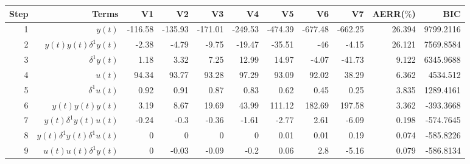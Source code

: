 \begin{tabular}{rrrrrrrrrrr}
Step & Terms & V1 & V2 & V3 & V4 & V5 & V6 & V7 & AERR($\%$) & BIC \\ 
\hline 
1 & $y(t)$ & -116.58 & -135.93 & -171.01 & -249.53 & -474.39 & -677.48 & -662.25 & 26.394 & 9799.2116 \\ 
2 & $y(t)y(t)\delta^1 y(t)$ & -2.38 & -4.79 & -9.75 & -19.47 & -35.51 & -46 & -4.15 & 26.121 & 7569.8584 \\ 
3 & $\delta^1 y(t)$ & 1.18 & 3.32 & 7.25 & 12.99 & 14.97 & -4.07 & -41.73 & 9.122 & 6345.9688 \\ 
4 & $u(t)$ & 94.34 & 93.77 & 93.28 & 97.29 & 93.09 & 92.02 & 38.29 & 6.362 & 4534.512 \\ 
5 & $\delta^1 u(t)$ & 0.92 & 0.91 & 0.87 & 0.83 & 0.62 & 0.45 & 0.25 & 3.835 & 1289.4161 \\ 
6 & $y(t)y(t)y(t)$ & 3.19 & 8.67 & 19.69 & 43.99 & 111.12 & 182.69 & 197.58 & 3.362 & -393.3668 \\ 
7 & $y(t)\delta^1 y(t)u(t)$ & -0.24 & -0.3 & -0.36 & -1.61 & -2.77 & 2.61 & -6.09 & 0.198 & -574.7645 \\ 
8 & $y(t)\delta^1 y(t)\delta^1 u(t)$ & 0 & 0 & 0 & 0 & 0.01 & 0.01 & 0.19 & 0.074 & -585.8226 \\ 
9 & $u(t)u(t)\delta^1 y(t)$ & 0 & -0.03 & -0.09 & -0.2 & 0.06 & 2.8 & -5.16 & 0.079 & -586.8134 \\ 
\hline 
\end{tabular}